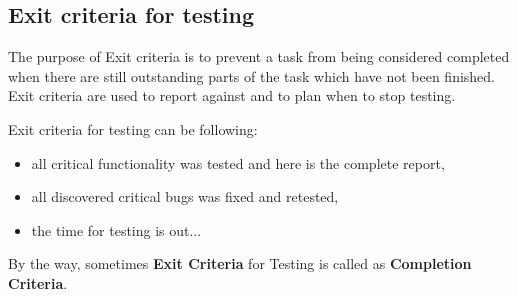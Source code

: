 \subsection{Exit criteria for testing}
\label{sec:Exit criteria for testing}

 The purpose of Exit criteria is to prevent a task from being considered completed when there are still outstanding parts of the task which have not been finished. Exit criteria are used to report against and to plan when to stop testing. 

Exit criteria for testing can be following:

    \begin{itemize}
\item     all critical functionality was tested and here is the complete report,
\item     all discovered critical bugs was fixed and retested,
\item     the time for testing is out...\end{itemize}

By the way, sometimes \textbf{Exit Criteria} for Testing is called as \textbf{Completion Criteria}.
